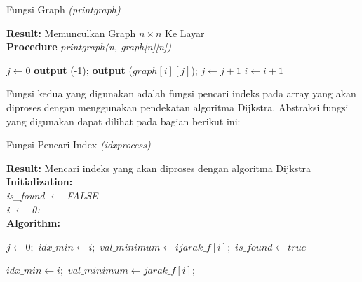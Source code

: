 \documentclass[conference]{IEEEtran}
\begin{document}
    \begin{algorithm}
        \caption{ Fungsi Graph \textit{(printgraph)}} 
        \textbf{Result: }Memunculkan Graph $n \times n$ Ke Layar\\
        \textbf{Procedure }\textit{printgraph(n, graph[n][n])}

        \begin{algorithmic}[1]
                \State $j \leftarrow 0$
                        \State \textbf{output} (-1);
                    \Else
                    \State \textbf{output} ($graph[i][j]$);
                    \State $j \leftarrow j+1$
                \State $i \leftarrow i+1$
       
        \end{algorithmic}
    \end{algorithm}

    Fungsi kedua yang digunakan adalah fungsi pencari indeks pada array yang akan diproses dengan menggunakan pendekatan algoritma Dijkstra. Abstraksi fungsi yang digunakan dapat dilihat pada bagian berikut ini:

    \begin{algorithm}
        \caption{ Fungsi Pencari Index \textit{(idxprocess)}} 
        \textbf{Result: } Mencari indeks yang akan diproses dengan algoritma Dijkstra\\
        \textbf{Initialization: }\\
        \textit{is\_found $\leftarrow$ FALSE }\\
        \textit{i $\leftarrow$ 0: }\\
        \textbf{Algorithm: }

        \begin{algorithmic}[1]
                \State $j \leftarrow 0;$
                    \State $idx\_min \leftarrow i;$
                    \State $val\_minimum \leftarrow ijarak\_f[i];$
                    \State $is\_found \leftarrow true$
                
                    \State $idx\_min \leftarrow i;$
                    \State $val\_minimum \leftarrow jarak\_f[i];$
            \\
            \Else\\
        \end{algorithmic}
    \end{algorithm}
\end{document}
